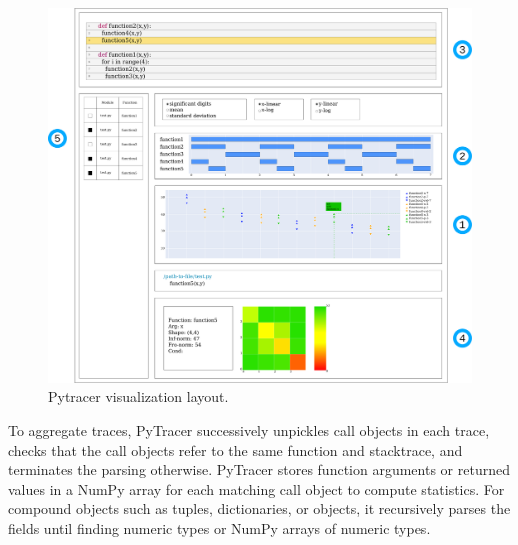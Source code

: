 \documentclass[10pt,journal,compsoc]{IEEEtran}
\newcommand{\pytracer}[0]{PyTracer\xspace}
\begin{document}
\begin{figure}
    \centering
    \includegraphics[width=\columnwidth]{figure/pytracer_layout.pdf}
    \caption{Pytracer visualization layout.}
    \label{fig:visu-layout}
\end{figure}


To aggregate traces, \pytracer successively unpickles call objects in each
trace, checks that the call objects refer to the same function and stacktrace,
and terminates the parsing otherwise. PyTracer stores function arguments or
returned values in a NumPy array for each matching call object to compute
statistics. For compound objects such as tuples, dictionaries, or objects, it
recursively parses the fields until finding numeric types or NumPy arrays of
numeric types.
\end{document}
